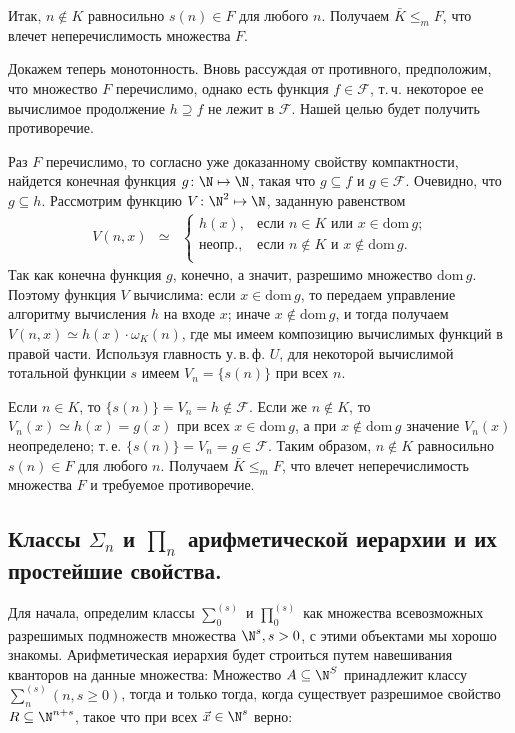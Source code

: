 \documentclass[a4paper, 10pt]{article}
\newcommand{\dom}{\text{dom}\,}
\begin{document}
Итак, $n \notin K$ равносильно $s(n) \in F$ для любого $n$. Получаем $\bar K \leq_m F$, что влечет неперечислимость множества $F$.

Докажем теперь монотонность. Вновь рассуждая от противного, предположим, что множество $F$ перечислимо, однако есть функция $f \in \mathcal F$, т.\,ч. некоторое ее вычислимое продолжение $h \supseteq f$ не лежит в $\mathcal F$. Нашей целью будет получить противоречие.

Раз $F$ перечислимо, то согласно уже доказанному свойству компактности, найдется конечная функция $g\colon \N \mapsto \N$, такая что $g \subseteq f$ и $g \in \mathcal F$. Очевидно, что $g \subseteq h$. Рассмотрим функцию $V\colon \N^2 \mapsto \N$, заданную равенством
$$\begin{array}{rcl}
V(n, x)&\simeq&\begin{cases}
                  h(x),&\text{если $n \in K$ или $x \in \dom g$;}\\
		 \mbox{неопр.},&\text{если $n \notin K$ и $x \notin \dom g$}.\\
		  \end{cases}
\end{array}$$
Так как конечна функция $g$, конечно, а значит, разрешимо множество $\dom g$. Поэтому функция $V$ вычислима: если $x \in \dom g$, то передаем управление алгоритму вычисления $h$ на входе $x$; иначе $x \notin \dom g$, и тогда получаем $V(n,x) \simeq h(x) \cdot \omega_K(n)$, где мы имеем композицию вычислимых функций в правой части. Используя главность у.\,в.\,ф. $U$, для некоторой вычислимой тотальной функции $s$ имеем $V_n = \{s(n)\}$ при всех $n$.

Если $n \in K$, то $\{s(n)\} = V_n = h \notin \mathcal F$. Если же $n \notin K$, то $V_n(x) \simeq h(x) = g(x)$ при всех $x \in \dom g$, а при $x \notin \dom g$ значение $V_n(x)$ неопределено; т.\,е. $\{s(n)\} = V_n = g \in \mathcal F$. Таким образом, $n \notin K$ равносильно $s(n) \in F$ для любого $n$. Получаем $\bar K \leq_m F$, что влечет неперечислимость множества $F$ и требуемое противоречие.

\subsection{Классы $\Sigma_n$ и $\prod_n$ арифметической иерархии и их простейшие свойства.}

Для начала, определим классы $\sum_0^{(s)}$ и $\prod_0^{(s)}$ как множества всевозможных разрешимых подмножеств множества $\N^s, s > 0$, с этими объектами мы хорошо знакомы. Арифметическая иерархия будет строиться путем навешивания кванторов на данные множества:
Множество $A \subseteq \N^S$ принадлежит классу $\sum_n^{(s)} (n,s \geq 0)$, тогда и только тогда, когда существует разрешимое свойство $R \subseteq \N^{n+s}$, такое что при всех $\vec{x} \in \N^{s}$ верно:
\end{document}
